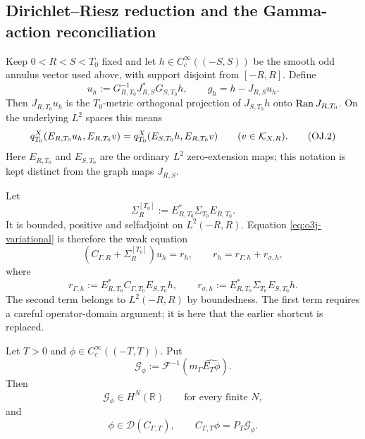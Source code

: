 
\subsection{Dirichlet--Riesz reduction and the Gamma-action reconciliation}\label{subsec:o3j-reconciled}

Keep $0<R<S<T_0$ fixed and let
$h\in C_c^\infty((-S,S))$ be the smooth odd annulus vector used above, with support
disjoint from $[-R,R]$.  Define
\[
 u_h:=G_{R,T_0}^{-1}J_{R,S}^*G_{S,T_0}h,
 \qquad
 g_h=h-J_{R,S}u_h.
\tag{OJ.1}\label{eq:o3j-uh}
\]
Then $J_{R,T_0}u_h$ is the $T_0$-metric orthogonal projection of
$J_{S,T_0}h$ onto $\operatorname{Ran} J_{R,T_0}$.  On the underlying $L^2$ spaces this means
\[
 q_{T_0}^X(E_{R,T_0}u_h,E_{R,T_0}v)
 =q_{T_0}^X(E_{S,T_0}h,E_{R,T_0}v)
 \qquad(v\in\mathcal K_{X,R}).
\tag{OJ.2}\label{eq:o3j-variational}
\]
Here $E_{R,T_0}$ and $E_{S,T_0}$ are the ordinary $L^2$ zero-extension maps; this
notation is kept distinct from the graph maps $J_{R,S}$.

Let
\[
 \Sigma_R^{[T_0]}
 :=E_{R,T_0}^*\Sigma_{T_0}E_{R,T_0}.
\tag{OJ.3}\label{eq:o3j-schur-restriction}
\]
It is bounded, positive and selfadjoint on $L^2(-R,R)$.  Equation
\eqref{eq:o3j-variational} is therefore the weak equation
\[
 (C_{\Gamma,R}+\Sigma_R^{[T_0]})u_h=r_h,
 \qquad
 r_h=r_{\Gamma,h}+r_{\sigma,h},
\tag{OJ.4}\label{eq:o3j-forcing-equation}
\]
where
\[
 r_{\Gamma,h}
 :=E_{R,T_0}^*C_{\Gamma,T_0}E_{S,T_0}h,
 \qquad
 r_{\sigma,h}
 :=E_{R,T_0}^*\Sigma_{T_0}E_{S,T_0}h.
\tag{OJ.5}\label{eq:o3j-forcing-split}
\]
The second term belongs to $L^2(-R,R)$ by boundedness.  The first term requires a
careful operator-domain argument; it is here that the earlier shortcut is replaced.

\begin{lemma}\label{lem:gamma-smooth-action}
Let $T>0$ and $\phi\in C_c^\infty((-T,T))$.  Put
\[
 \boxed{
 \mathcal G_\phi
 :=\mathcal F^{-1}\!\left(m_\Gamma\widehat{E_T\phi}\right).
 }
\tag{OJ.6}\label{eq:gamma-Gphi}
\]
Then
\[
 \mathcal G_\phi\in H^N(\mathbb R)
 \qquad\text{for every finite }N,
\tag{OJ.7}\label{eq:gamma-Gphi-sobolev}
\]
and
\[
 \boxed{
 \phi\in\mathcal D(C_{\Gamma,T}),
 \qquad
 C_{\Gamma,T}\phi=P_T\mathcal G_\phi.
 }
\tag{OJ.8}\label{eq:gamma-smooth-action}
\]
\end{lemma}

